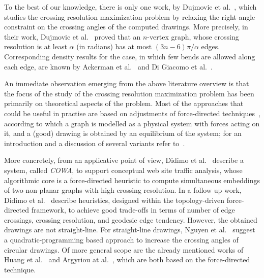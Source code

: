 \documentclass[runningheads]{llncs}
\begin{document}
To the best of our knowledge, there is only one work, by Dujmovic et al.~\cite{DBLP:journals/cjtcs/DujmovicGMW11}, which studies the crossing resolution maximization problem by relaxing the right-angle constraint on the crossing angles of the computed drawings. More precisely, in their work, Dujmovic et al.~\cite{DBLP:journals/cjtcs/DujmovicGMW11} proved that an $n$-vertex graph, whose crossing resolution is at least $\alpha$ (in radians) has at most $(3n-6)\pi/\alpha$ edges. Corresponding density results for the case, in which few bends are allowed along each edge, are known by Ackerman et al.~\cite{DBLP:journals/siamdm/AckermanFT12} and Di Giacomo et al.~\cite{DBLP:journals/mst/GiacomoDLM11}.  

An immediate observation emerging from the above literature overview is that the focus of the study of the crossing resolution maximization problem has been primarily on theoretical aspects of the problem. Most of the approaches that could be useful in practise are based on adjustments of force-directed techniques~\cite{DBLP:journals/congnum/Eades84}, according to which a graph is modelled as a physical system with forces acting on it, and a (good) drawing is obtained by an equilibrium of the system; for an introduction and a discussion of several variants refer to~\cite{DBLP:books/ph/BattistaETT99}. %

More concretely, from an applicative point of view, Didimo et al.~\cite{DBLP:conf/apvis/DidimoLR10} describe a system, called \emph{COWA}, to support conceptual web site traffic analysis, whose algorithmic core is a force-directed heuristic to compute simultaneous embeddings of two non-planar graphs with high crossing resolution. 
%
In a follow up work, Didimo et al.~\cite{DBLP:conf/gd/DidimoLR10} describe heuristics, designed within the topology-driven force-directed framework, to achieve good trade-offs in terms of number of edge crossings, crossing resolution, and geodesic edge tendency. 
%
However, the obtained drawings are not straight-line. For straight-line drawings, Nguyen et al.~\cite{DBLP:conf/gd/NguyenEHH10} suggest a quadratic-programming based approach to increase the crossing angles of circular drawings. 
%
Of more general scope are the already mentioned works of Huang et al.~\cite{DBLP:journals/vlc/HuangEHL13} and Argyriou at al.~\cite{DBLP:journals/cj/ArgyriouBS13}, which are both based on the force-directed technique. 
\end{document}
